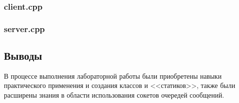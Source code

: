 \documentclass[12pt]{article}
\begin{document}
	
	
	\subsubsection*{client.cpp}
	
	
	
	\subsubsection*{server.cpp}
	
	
	
	\subsection*{Выводы}
	
	В процессе выполнения лабораторной работы были приобретены навыки практического применения и создания классов и <<статиков>>, также были расширены знания в области использования сокетов очередей сообщений.
	
\end{document}
